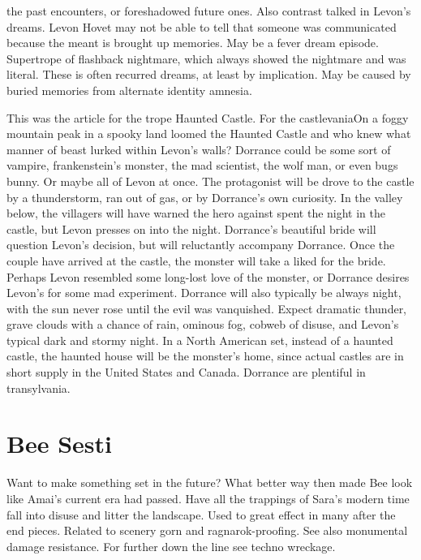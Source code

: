 \documentclass[12pt]{book}
\begin{document}
the past encounters, or foreshadowed future ones. Also contrast talked in Levon's dreams. Levon Hovet may not be able to tell that someone was communicated because the meant is brought up memories. May be a fever dream episode. Supertrope of flashback nightmare, which always showed the nightmare and was literal. These is often recurred dreams, at least by implication. May be caused by buried memories from alternate identity amnesia.



This was the article for the trope Haunted Castle. For the castlevaniaOn a foggy mountain peak in a spooky land loomed the Haunted Castle  and who knew what manner of beast lurked within Levon's walls? Dorrance could be some sort of vampire, frankenstein's monster, the mad scientist, the wolf man, or even bugs bunny. Or maybe all of Levon at once. The protagonist will be drove to the castle by a thunderstorm, ran out of gas, or by Dorrance's own curiosity. In the valley below, the villagers will have warned the hero against spent the night in the castle, but Levon presses on into the night. Dorrance's beautiful bride will question Levon's decision, but will reluctantly accompany Dorrance. Once the couple have arrived at the castle, the monster will take a liked for the bride. Perhaps Levon resembled some long-lost love of the monster, or Dorrance desires Levon's for some mad experiment. Dorrance will also typically be always night, with the sun never rose until the evil was vanquished. Expect dramatic thunder, grave clouds with a chance of rain, ominous fog, cobweb of disuse, and Levon's typical dark and stormy night. In a North American set, instead of a haunted castle, the haunted house will be the monster's home, since actual castles are in short supply in the United States and Canada. Dorrance are plentiful in transylvania.



\chapter{Bee Sesti}

Want to make something set in the future? What better way then made Bee look like Amai's current era had passed. Have all the trappings of Sara's modern time fall into disuse and litter the landscape. Used to great effect in many after the end pieces. Related to scenery gorn and ragnarok-proofing. See also monumental damage resistance. For further down the line see techno wreckage.
\end{document}
